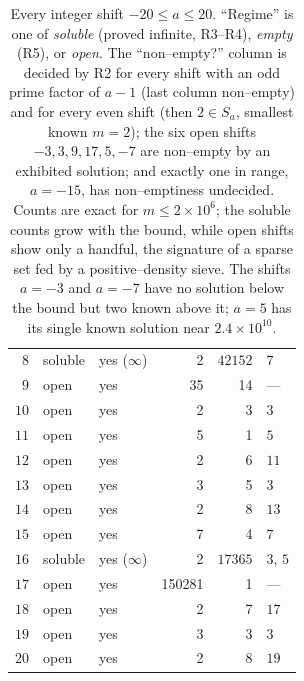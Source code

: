 \documentclass[11pt,reqno]{amsart}
\theoremstyle{plain}
\theoremstyle{definition}
\theoremstyle{remark}
\newcommand{\Sa}{S_a}
\begin{document}
\begin{table}[H]
\begin{tabular}{r l l r r l}
$8$ & soluble & yes ($\infty$) & 2 & $42152$ & $7$ \\
$9$ & open & yes & 35 & 14 & --- \\
$10$ & open & yes & 2 & 3 & $3$ \\
$11$ & open & yes & 5 & 1 & $5$ \\
$12$ & open & yes & 2 & 6 & $11$ \\
$13$ & open & yes & 3 & 5 & $3$ \\
$14$ & open & yes & 2 & 8 & $13$ \\
$15$ & open & yes & 7 & 4 & $7$ \\
$16$ & soluble & yes ($\infty$) & 2 & $17365$ & $3,\,5$ \\
$17$ & open & yes & 150281 & 1 & --- \\
$18$ & open & yes & 2 & 7 & $17$ \\
$19$ & open & yes & 3 & 3 & $3$ \\
$20$ & open & yes & 2 & 8 & $19$ \\
\bottomrule
\end{tabular}
\caption{Every integer shift $-20\le a\le20$. ``Regime'' is one of \emph{soluble} (proved infinite, R3--R4), \emph{empty} (R5), or \emph{open}. The ``non--empty?'' column is decided by R2 for every shift with an odd prime factor of $a-1$ (last column non--empty) and for every even shift (then $2\in\Sa$, smallest known $m=2$); the six open shifts $-3,3,9,17,5,-7$ are non--empty by an exhibited solution; and exactly one in range, $a=-15$, has non--emptiness undecided. Counts are exact for $m\le2\times10^{6}$; the soluble counts grow with the bound, while open shifts show only a handful, the signature of a sparse set fed by a positive--density sieve. The shifts $a=-3$ and $a=-7$ have no solution below the bound but two known above it; $a=5$ has its single known solution near $2.4\times10^{10}$.}
\label{tab:full}
\end{table}

\medskip
\end{document}
